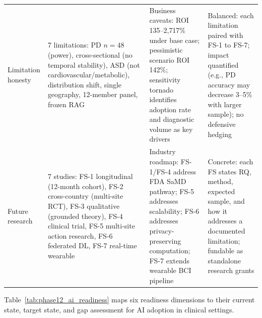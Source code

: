 \begin{xltabular}{\textwidth}{@{} l X X X @{}}
\addlinespace
Limitation honesty         & 7 limitations: PD $n = 48$ (power), cross-sectional (no temporal stability), ASD (not cardiovascular/metabolic), distribution shift, single geography, 12-member panel, frozen RAG & Business caveats: ROI 135--2{,}717\% under base case; pessimistic scenario ROI 142\%; sensitivity tornado identifies adoption rate and diagnostic volume as key drivers & Balanced: each limitation paired with FS-1 to FS-7; impact quantified (e.g., PD accuracy may decrease 3--5\% with larger sample); no defensive hedging \\
\addlinespace
Future research            & 7 studies: FS-1 longitudinal (12-month cohort), FS-2 cross-country (multi-site RCT), FS-3 qualitative (grounded theory), FS-4 clinical trial, FS-5 multi-site action research, FS-6 federated DL, FS-7 real-time wearable & Industry roadmap: FS-1/FS-4 address FDA SaMD pathway; FS-5 addresses scalability; FS-6 addresses privacy-preserving computation; FS-7 extends wearable BCI pipeline & Concrete: each FS states RQ, method, expected sample, and how it addresses a documented limitation; fundable as standalone research grants \\
\end{xltabular}
\endgroup

\vspace{1.5em}

Table~\ref{tab:phase12_ai_readiness} maps six readiness dimensions to their current state, target state, and gap assessment for AI adoption in clinical settings.

